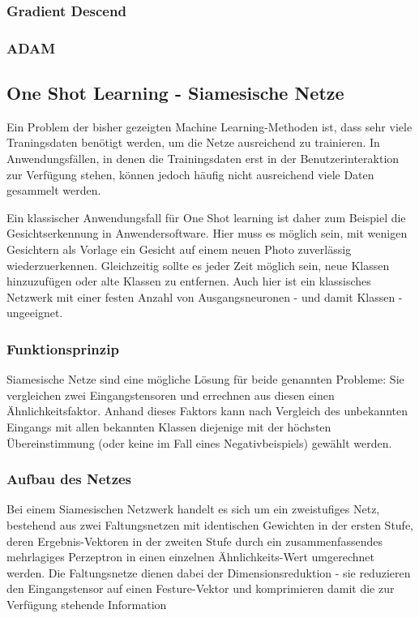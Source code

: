 		\subsubsection{Gradient Descend}
		\label{sec:gradient-descend}
		
		\subsubsection{ADAM}
		
	\subsection{ One Shot Learning - Siamesische Netze }
	Ein Problem der bisher gezeigten Machine Learning-Methoden ist, dass sehr viele Traningsdaten benötigt werden, um die Netze ausreichend zu trainieren. In Anwendungsfällen, in denen die Trainingsdaten erst in der Benutzerinteraktion zur Verfügung stehen, können jedoch häufig nicht ausreichend viele Daten gesammelt werden. 
	
	Ein klassischer Anwendungsfall für One Shot learning ist daher zum Beispiel die Gesichtserkennung in Anwendersoftware. Hier muss es möglich sein, mit wenigen Gesichtern als Vorlage ein Gesicht auf einem neuen Photo zuverlässig wiederzuerkennen. Gleichzeitig sollte es jeder Zeit möglich sein, neue Klassen hinzuzufügen oder alte Klassen zu entfernen. Auch hier ist ein klassisches Netzwerk mit einer festen Anzahl von Ausgangsneuronen - und damit Klassen - ungeeignet.

	\subsubsection{Funktionsprinzip}
		Siamesische Netze sind eine mögliche Lösung für beide genannten Probleme: Sie vergleichen zwei Eingangstensoren und errechnen aus diesen einen Ähnlichkeitsfaktor. Anhand dieses Faktors kann nach Vergleich des unbekannten Eingangs mit allen bekannten Klassen diejenige mit der höchsten Übereinstimmung (oder keine im Fall eines Negativbeispiels) gewählt werden.
		
	\subsubsection{Aufbau des Netzes}
	 Bei einem Siamesischen Netzwerk handelt es sich um ein zweistufiges Netz, bestehend aus zwei Faltungsnetzen mit identischen Gewichten in der ersten Stufe, deren Ergebnis-Vektoren in der zweiten Stufe durch ein zusammenfassendes mehrlagiges Perzeptron in einen einzelnen Ähnlichkeits-Wert umgerechnet werden.
	 Die Faltungsnetze dienen dabei der Dimensionsreduktion - sie reduzieren den Eingangstensor auf einen Festure-Vektor und komprimieren damit die zur Verfügung stehende Information 
	 
